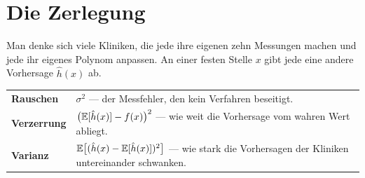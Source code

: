 \section{Die Zerlegung}

\begin{merksatz}
Man denke sich viele Kliniken, die jede ihre eigenen zehn Messungen machen und jede ihr eigenes Polynom anpassen. An einer festen Stelle $x$ gibt jede eine andere Vorhersage $\hat h(x)$ ab.

\begin{center}
{\small
\renewcommand{\arraystretch}{1.55}
\begin{tabular}{@{}P{2.4cm}P{6.2cm}@{}}
\toprule
\textbf{Rauschen} & $\sigma^{2}$ --- der Messfehler, den kein Verfahren beseitigt.\\
\textbf{Verzerrung} & $\bigl(\mathbb{E}[\hat h(x)] - f(x)\bigr)^{2}$ --- wie weit die  Vorhersage vom wahren Wert abliegt.\\
\textbf{Varianz} & $\mathbb{E}\bigl[(\hat h(x) - \mathbb{E}[\hat h(x)])^{2}\bigr]$ --- wie stark die Vorhersagen der Kliniken untereinander schwanken.\\
\bottomrule
\end{tabular}}
\end{center}
\end{merksatz}

